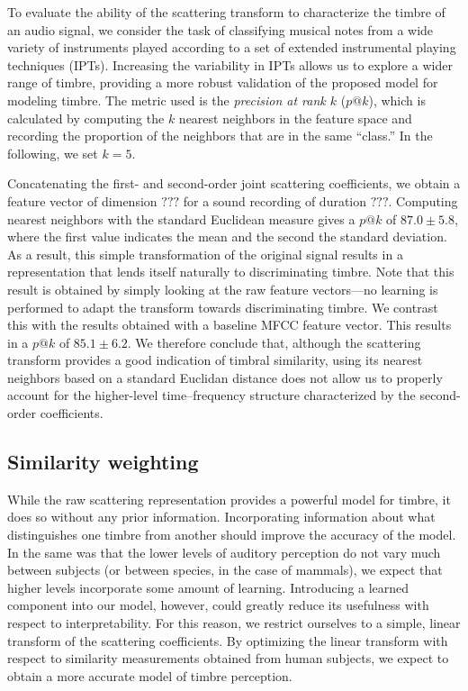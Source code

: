 \documentclass{article}
\makeatletter
\newcommand{\patk}{p\mathrm{@}k}
\makeatother
\begin{document}
To evaluate the ability of the scattering transform to characterize the timbre of an audio signal, we consider the task of classifying musical notes from a wide variety of instruments played according to a set of extended instrumental playing techniques (IPTs).
Increasing the variability in IPTs allows us to explore a wider range of timbre, providing a more robust validation of the proposed model for modeling timbre.
The metric used is the \emph{precision at rank $k$} ($\patk$), which is calculated by computing the $k$ nearest neighbors in the feature space and recording the proportion of the neighbors that are in the same ``class.''
In the following, we set $k = 5$.

Concatenating the first- and second-order joint scattering coefficients, we obtain a feature vector of dimension $???$ for a sound recording of duration $???$.
Computing nearest neighbors with the standard Euclidean measure gives a $\patk$ of $87.0 \pm 5.8$, where the first value indicates the mean and the second the standard deviation.
As a result, this simple transformation of the original signal results in a representation that lends itself naturally to discriminating timbre.
Note that this result is obtained by simply looking at the raw feature vectors---no learning is performed to adapt the transform towards discriminating timbre.
We contrast this with the results obtained with a baseline MFCC feature vector.
This results in a $\patk$ of $85.1 \pm 6.2$.
We therefore conclude that, although the scattering transform provides a good indication of timbral similarity, using its nearest neighbors based on a standard Euclidan distance does not allow us to properly account for the higher-level time--frequency structure characterized by the second-order coefficients.

\subsection{Similarity weighting}
\label{sec:weighting}

While the raw scattering representation provides a powerful model for timbre, it does so without any prior information.
Incorporating information about what distinguishes one timbre from another should improve the accuracy of the model.
In the same was that the lower levels of auditory perception do not vary much between subjects (or between species, in the case of mammals), we expect that higher levels incorporate some amount of learning.
Introducing a learned component into our model, however, could greatly reduce its usefulness with respect to interpretability.
For this reason, we restrict ourselves to a simple, linear transform of the scattering coefficients.
By optimizing the linear transform with respect to similarity measurements obtained from human subjects, we expect to obtain a more accurate model of timbre perception.
\end{document}
